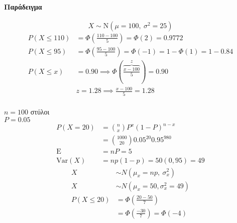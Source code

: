 \documentclass[11pt,a4paper,titlepage,draft]{article}
\begin{document}
\paragraph{Παράδειγμα}
\[
X \sim \mathrm N(\mu = 100, \ \sigma^2=25)
\]
\begin{align*}
P(X \leq 110) &= \Phi \left(
\frac{110-100}{5}
\right) = \Phi(2) = 0.9772 \\
P(X \leq 95) &= \Phi\left(
\frac{95-100}{5}
\right) = \Phi(-1) = 1-\Phi(1) = 1-0.84\\
P(X \leq x) &= 0.90 \implies \Phi(\overbrace{\frac{x-100}{5}}^{z}) = 0.90 \\
& z = 1.28 \implies \frac{x-100}{5}=1.28
\end{align*}


\paragraph{}
\(n= 100\) στύλοι \\
\(P = 0.05\) \\
\begin{align*}
P(X=20) &= \binom{n}{x} P^x (1-P)^{n-x} \\
&= \binom{1000}{20}0.05^{20} 0.95^{980} \\
\mathrm E &= nP = 5 \\
\mathrm{Var}(X) &= np(1-p) = 50(0,95)=49
\end{align*}
\begin{align*}
X &\sim N(\mu_x=np,\ \sigma_x^2) \\
X &\sim N(\mu_x = 50, \sigma_x^2 = 49) \\
P(X \leq 20) &=\Phi \left(
\frac{20-50}{7}
\right) \\
&= \Phi \left(
\frac{-30}{7}
\right) = \Phi(-4)
\end{align*}
\end{document}
